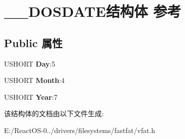 \hypertarget{struct_____d_o_s_d_a_t_e}{}\section{\+\_\+\+\_\+\+D\+O\+S\+D\+A\+T\+E结构体 参考}
\label{struct_____d_o_s_d_a_t_e}
\subsection*{Public 属性}
\begin{DoxyCompactItemize}
\item 
\mbox{\label{struct_____d_o_s_d_a_t_e_a7de07930fd33039e836e329876948be0}} 
U\+S\+H\+O\+RT {\bfseries Day}\+:5
\item 
\mbox{\label{struct_____d_o_s_d_a_t_e_a93c6d04e2c60c2647e8de9f039644fa7}} 
U\+S\+H\+O\+RT {\bfseries Month}\+:4
\item 
\mbox{\label{struct_____d_o_s_d_a_t_e_a4610d08748070e5e9522e1aee85c499e}} 
U\+S\+H\+O\+RT {\bfseries Year}\+:7
\end{DoxyCompactItemize}


该结构体的文档由以下文件生成\+:\begin{DoxyCompactItemize}
\item 
E\+:/\+React\+O\+S-\/0../drivers/filesystems/fastfat/vfat.\+h\end{DoxyCompactItemize}
